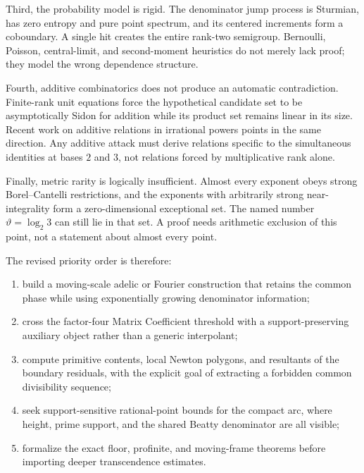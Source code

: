 \documentclass[11pt,oneside]{article}
\theoremstyle{definition}
\theoremstyle{remark}
\newcommand{\thetaq}{\vartheta}
\begin{document}
Third, the probability model is rigid.  The denominator jump process is Sturmian, has zero
entropy and pure point spectrum, and its centered increments form a coboundary.  A single hit
creates the entire rank-two semigroup.  Bernoulli, Poisson, central-limit, and second-moment
heuristics do not merely lack proof; they model the wrong dependence structure.

Fourth, additive combinatorics does not produce an automatic contradiction.  Finite-rank unit
equations force the hypothetical candidate set to be asymptotically Sidon for addition while
its product set remains linear in its size.  Recent work on additive relations in irrational
powers points in the same direction.  Any additive attack must derive relations specific to
the simultaneous identities at bases $2$ and $3$, not relations forced by multiplicative rank
alone.

Finally, metric rarity is logically insufficient.  Almost every exponent obeys strong
Borel--Cantelli restrictions, and the exponents with arbitrarily strong near-integrality form a
zero-dimensional exceptional set.  The named number $\thetaq=\log_2 3$ can still lie in that
set.  A proof needs arithmetic exclusion of this point, not a statement about almost every
point.

The revised priority order is therefore:
\begin{enumerate}
\item build a moving-scale adelic or Fourier construction that retains the common phase while
using exponentially growing denominator information;
\item cross the factor-four Matrix Coefficient threshold with a support-preserving auxiliary
object rather than a generic interpolant;
\item compute primitive contents, local Newton polygons, and resultants of the boundary
residuals, with the explicit goal of extracting a forbidden common divisibility sequence;
\item seek support-sensitive rational-point bounds for the compact arc, where height, prime
support, and the shared Beatty denominator are all visible;
\item formalize the exact floor, profinite, and moving-frame theorems before importing deeper
transcendence estimates.
\end{enumerate}
\end{document}
